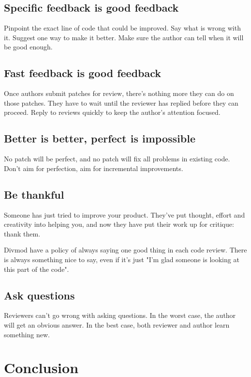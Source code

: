 \documentclass{article}
\begin{document}
\subsection{Specific feedback is good feedback}

Pinpoint the exact line of code that could be improved. Say what is wrong with it. Suggest one way to make it better. Make sure the author can tell when it will be good enough.

\subsection{Fast feedback is good feedback}

Once authors submit patches for review, there's nothing more they can do on those patches. They have to wait until the reviewer has replied before they can proceed. Reply to reviews quickly to keep the author's attention focused.

\subsection{Better is better, perfect is impossible}

No patch will be perfect, and no patch will fix all problems in existing code. Don't aim for perfection, aim for incremental improvements.

\subsection{Be thankful}

Someone has just tried to improve your product. They've put thought, effort and creativity into helping you, and now they have put their work up for critique: thank them.

Divmod have a policy of always saying one good thing in each code review. There is always something nice to say, even if it's just "I'm glad someone is looking at this part of the code".

\subsection{Ask questions}

Reviewers can't go wrong with asking questions. In the worst case, the author will get an obvious answer. In the best case, both reviewer and author learn something new.


\section{Conclusion}
\end{document}
